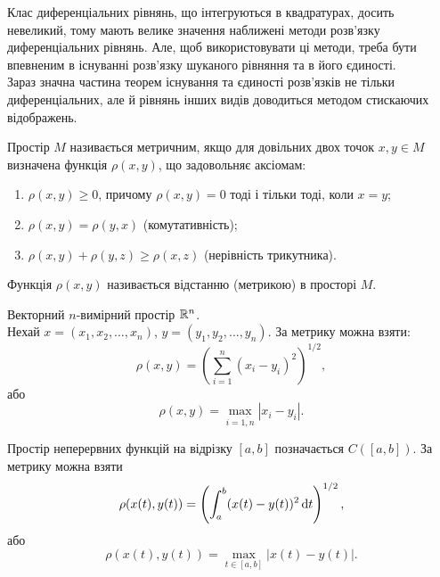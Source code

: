Клас диференціальних рівнянь, що інтегруються в квадратурах, досить невеликий, тому мають велике значення наближені методи розв'язку диференціальних рівнянь. Але, щоб використовувати ці методи, треба бути впевненим в існуванні розв'язку шуканого рівняння та в його єдиності. \\

Зараз значна частина теорем існування  та єдиності розв'язків не тільки диференціальних, але й рівнянь інших видів доводиться методом стискаючих відображень. \\

\begin{definition} 
	Простір $M$ називається метричним, якщо для довільних двох точок $x,y\in M$ визначена функція $\rho(x,y)$, що задовольняє аксіомам:
	\begin{enumerate}
		\item $\rho(x, y)\ge0$, причому $\rho(x,y)=0$ тоді і тільки тоді, коли $x=y$;
		\item $\rho(x,y)=\rho(y,x)$ (комутативність);
		\item $\rho(x,y)+\rho(y,z)\ge\rho(x,z)$ (нерівність трикутника).
	\end{enumerate}

	Функція $\rho(x,y)$ називається відстанню (метрикою) в просторі $M$.
\end{definition}

\begin{example*} 
	Векторний $n$-вимірний простір $\mathbb{R}^n$. \\

	Нехай $x=(x_1,x_2,\ldots,x_n)$, $y=(y_1,y_2,\ldots,y_n)$. За метрику можна взяти: 
	\begin{equation*}
		\rho(x,y)=\left(\sum_{i=1}^n (x_i-y_i)^2\right)^{1/2},
	\end{equation*}
	або 
	\begin{equation*}
		\rho(x,y)=\max_{i=\overline{1,n}}|x_i-y_i|.
	\end{equation*}
\end{example*}

\begin{example*} 
	Простір неперервних функцій на відрізку $[a,b]$ позначається $C([a,b])$. За метрику можна взяти
		\begin{equation*}
		\rho(x(t), y(t)) = \left(\int_a^b (x(t)-y(t))^2 \mathop{}\!\mathrm{d} t\right)^{1/2},
	\end{equation*}
	або
	\begin{equation*}
		\rho(x(t), y(t)) = \max_{t\in[a,b]} |x(t)-y(t)|.
	\end{equation*}
\end{example*}


